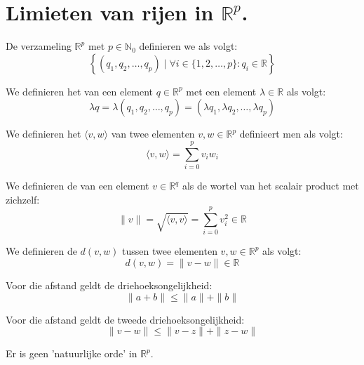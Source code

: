 \documentclass[main.tex]{subfiles}
\begin{document}
\section{Limieten van rijen in $\mathbb{R}^{p}$.}
\label{cha:cont-voor-funct}

\begin{de}
  De verzameling $\mathbb{R}^{p}$ met $p\in \mathbb{N}_{0}$ definieren we als volgt:
  \[ \left\{ (q_{1},q_{2},\dotsc,q_{p}) \mid \forall i \in \{1,2,\dotsc,p\}: q_{i}\in \mathbb{R} \right\} \]
\end{de}

\begin{de}
  We definieren het  van een element $q\in \mathbb{R}^{p}$ met een element $\lambda\in \mathbb{R}$ als volgt:
  \[ \lambda q = \lambda (q_{1},q_{2},\dotsc,q_{p}) = (\lambda q_{1},\lambda q_{2},\dotsc,\lambda q_{p}) \]
\end{de}

\begin{de}
  We definieren het  $\langle v,w \rangle$ van twee elementen $v,w\in \mathbb{R}^{p}$ definieert men als volgt:
  \[ \langle v,w \rangle = \sum_{i=0}^{p}v_{i}w_{i} \]
\end{de}

\begin{de}
  We definieren de  van een element $v\in \mathbb{R}^{q}$ als de wortel van het scalair product met zichzelf:
  \[ \|v\| = \sqrt{\langle v,v \rangle} = \sum_{i=0}^{p}v_{i}^{2} \in \mathbb{R} \]
\end{de}

\begin{de}
  We definieren de  $d(v,w)$ tussen twee elementen $v,w \in \mathbb{R}^{p}$ als volgt:
  \[ d(v,w) = \|v-w\| \in \mathbb{R} \]
\end{de}

\begin{st}
  \label{st:eerste-driehoeksongelijkheid-rp}
  Voor die afstand geldt de driehoeksongelijkheid:
  \[ \|a+b\| \le \|a\| + \|b\| \]
\end{st}

\begin{st}
  \label{st:tweede-driehoeksongelijkheid-rp}
  Voor die afstand geldt de tweede driehoeksongelijkheid:
  \[ \|v-w\| \le \|v-z\| + \|z-w\| \]
\end{st}

\begin{st}
  Er is geen 'natuurlijke orde' in $\mathbb{R}^{p}$.
\end{st}
\end{document}
